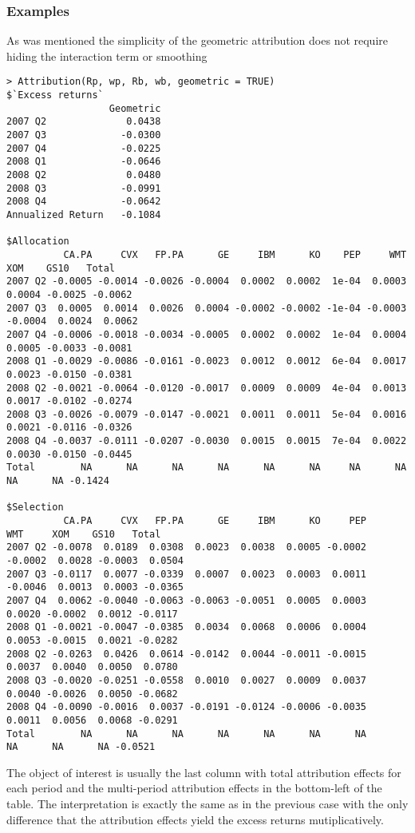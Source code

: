 \documentclass[11pt,a4paper]{article}
\begin{document}
\subsubsection{Examples}
As was mentioned the simplicity of the geometric attribution does not require hiding the interaction term or smoothing
\begingroup
\fontsize{9pt}{12pt}\selectfont
\begin{verbatim}
> Attribution(Rp, wp, Rb, wb, geometric = TRUE)
$`Excess returns`
                  Geometric
2007 Q2              0.0438
2007 Q3             -0.0300
2007 Q4             -0.0225
2008 Q1             -0.0646
2008 Q2              0.0480
2008 Q3             -0.0991
2008 Q4             -0.0642
Annualized Return   -0.1084

$Allocation
          CA.PA     CVX   FP.PA      GE     IBM      KO    PEP     WMT     XOM    GS10   Total
2007 Q2 -0.0005 -0.0014 -0.0026 -0.0004  0.0002  0.0002  1e-04  0.0003  0.0004 -0.0025 -0.0062
2007 Q3  0.0005  0.0014  0.0026  0.0004 -0.0002 -0.0002 -1e-04 -0.0003 -0.0004  0.0024  0.0062
2007 Q4 -0.0006 -0.0018 -0.0034 -0.0005  0.0002  0.0002  1e-04  0.0004  0.0005 -0.0033 -0.0081
2008 Q1 -0.0029 -0.0086 -0.0161 -0.0023  0.0012  0.0012  6e-04  0.0017  0.0023 -0.0150 -0.0381
2008 Q2 -0.0021 -0.0064 -0.0120 -0.0017  0.0009  0.0009  4e-04  0.0013  0.0017 -0.0102 -0.0274
2008 Q3 -0.0026 -0.0079 -0.0147 -0.0021  0.0011  0.0011  5e-04  0.0016  0.0021 -0.0116 -0.0326
2008 Q4 -0.0037 -0.0111 -0.0207 -0.0030  0.0015  0.0015  7e-04  0.0022  0.0030 -0.0150 -0.0445
Total        NA      NA      NA      NA      NA      NA     NA      NA      NA      NA -0.1424

$Selection
          CA.PA     CVX   FP.PA      GE     IBM      KO     PEP     WMT     XOM    GS10   Total
2007 Q2 -0.0078  0.0189  0.0308  0.0023  0.0038  0.0005 -0.0002 -0.0002  0.0028 -0.0003  0.0504
2007 Q3 -0.0117  0.0077 -0.0339  0.0007  0.0023  0.0003  0.0011 -0.0046  0.0013  0.0003 -0.0365
2007 Q4  0.0062 -0.0040 -0.0063 -0.0063 -0.0051  0.0005  0.0003  0.0020 -0.0002  0.0012 -0.0117
2008 Q1 -0.0021 -0.0047 -0.0385  0.0034  0.0068  0.0006  0.0004  0.0053 -0.0015  0.0021 -0.0282
2008 Q2 -0.0263  0.0426  0.0614 -0.0142  0.0044 -0.0011 -0.0015  0.0037  0.0040  0.0050  0.0780
2008 Q3 -0.0020 -0.0251 -0.0558  0.0010  0.0027  0.0009  0.0037  0.0040 -0.0026  0.0050 -0.0682
2008 Q4 -0.0090 -0.0016  0.0037 -0.0191 -0.0124 -0.0006 -0.0035  0.0011  0.0056  0.0068 -0.0291
Total        NA      NA      NA      NA      NA      NA      NA      NA      NA      NA -0.0521

\end{verbatim}
\endgroup
The object of interest is usually the last column with total attribution effects for each period and the multi-period attribution effects in the bottom-left of the table. The interpretation is exactly the same as in the previous case with the only difference that the attribution effects yield the excess returns mutiplicatively.
\end{document}
